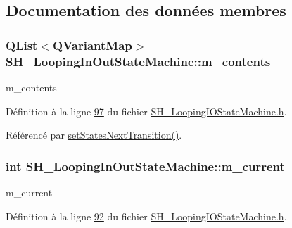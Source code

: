 \subsection{Documentation des données membres}
\hypertarget{classSH__LoopingInOutStateMachine_a145e625dcb4d5438bd9c761eeb9425d4}{
\subsubsection[{m\-\_\-contents}]{\setlength{\rightskip}{0pt plus 5cm}Q\-List$<$Q\-Variant\-Map$>$ S\-H\-\_\-\-Looping\-In\-Out\-State\-Machine\-::m\-\_\-contents\hspace{0.3cm}{\ttfamily [private]}}}\label{classSH__LoopingInOutStateMachine_a145e625dcb4d5438bd9c761eeb9425d4}


m\-\_\-contents 



Définition à la ligne \hyperlink{SH__LoopingIOStateMachine_8h_source_l00097}{97} du fichier \hyperlink{SH__LoopingIOStateMachine_8h_source}{S\-H\-\_\-\-Looping\-I\-O\-State\-Machine.\-h}.



Référencé par \hyperlink{classSH__LoopingInOutStateMachine_a0ee122553641721012f3710e71cce234}{set\-States\-Next\-Transition()}.

\hypertarget{classSH__LoopingInOutStateMachine_af64f9f28a1b8e82bd9ee5f4b96a7c82e}{
\subsubsection[{m\-\_\-current}]{\setlength{\rightskip}{0pt plus 5cm}int S\-H\-\_\-\-Looping\-In\-Out\-State\-Machine\-::m\-\_\-current\hspace{0.3cm}{\ttfamily [private]}}}\label{classSH__LoopingInOutStateMachine_af64f9f28a1b8e82bd9ee5f4b96a7c82e}


m\-\_\-current 



Définition à la ligne \hyperlink{SH__LoopingIOStateMachine_8h_source_l00092}{92} du fichier \hyperlink{SH__LoopingIOStateMachine_8h_source}{S\-H\-\_\-\-Looping\-I\-O\-State\-Machine.\-h}.




